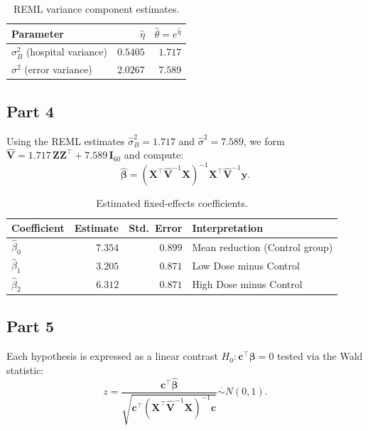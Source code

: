 \documentclass[letterpaper]{article}
\begin{document}
			\begin{table}[H]
				\centering
				\begin{tabular}{lrr}
					\toprule
					Parameter & $\hat{\eta}$ & $\hat{\theta} = e^{\hat{\eta}}$ \\
					\midrule
					$\sigma^2_B$ (hospital variance) & $0.5405$ & $1.717$ \\
					$\sigma^2$ (error variance)      & $2.0267$ & $7.589$ \\
					\bottomrule
				\end{tabular}
				\caption{REML variance component estimates.}
			\end{table}
			
			\subsection{Part 4}
			
			Using the REML estimates $\hat{\sigma}^2_B = 1.717$ and $\hat{\sigma}^2 = 7.589$,
			we form $\hat{\mathbf{V}} = 1.717\,\mathbf{Z}\mathbf{Z}^\top + 7.589\,\mathbf{I}_{60}$
			and compute:
			\[
			\hat{\boldsymbol{\beta}}
			= (\mathbf{X}^\top\hat{\mathbf{V}}^{-1}\mathbf{X})^{-1}
			\mathbf{X}^\top\hat{\mathbf{V}}^{-1}\mathbf{y}.
			\]
			
			\begin{table}[H]
				\centering
				\begin{tabular}{lrrl}
					\toprule
					Coefficient & Estimate & Std.\ Error & Interpretation \\
					\midrule
					$\hat{\beta}_0$ & $7.354$ & $0.899$ & Mean reduction (Control group) \\
					$\hat{\beta}_1$ & $3.205$ & $0.871$ & Low Dose minus Control \\
					$\hat{\beta}_2$ & $6.312$ & $0.871$ & High Dose minus Control \\
					\bottomrule
				\end{tabular}
				\caption{Estimated fixed-effects coefficients.}
			\end{table}
			
			\subsection{Part 5}
			
			Each hypothesis is expressed as a linear contrast
			$H_0: \mathbf{c}^\top\boldsymbol{\beta} = 0$ tested via the Wald statistic:
			\[
			z = \frac{\mathbf{c}^\top\hat{\boldsymbol{\beta}}}
			{\sqrt{\mathbf{c}^\top(\mathbf{X}^\top\hat{\mathbf{V}}^{-1}\mathbf{X})^{-1}\mathbf{c}}}
			\overset{\cdot}{\sim} N(0,1).
			\]
			
\end{document}
